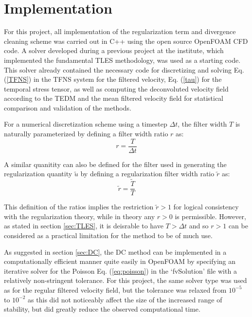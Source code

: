 \chapter{Implementation} \label{chap:Imp}


For this project, all implementation of the regularization term and divergence cleaning scheme was carried out in C++ using the open source OpenFOAM CFD code. A solver developed during a previous project at the institute, which implemented the fundamental TLES methodology, was used as a starting code. This solver already contained the necessary code for discretizing and solving Eq. (\ref{TFNS}) in the TFNS system for the filtered velocity, Eq. (\ref{tau}) for the temporal stress tensor, as well as computing the deconvoluted velocity field according to the TEDM and the mean filtered velocity field for statistical comparison and validation of the methods.

For a numerical discretization scheme using a timestep $\Delta t$, the filter width $T$ is naturally parameterized by defining a filter width ratio $r$ as:
\begin{equation} \label{r}
r=\frac{T}{\Delta t}
\end{equation}

A similar quanitity can also be defined for the filter used in generating the regularization quantity $\tilde{u}$ by defining a regularization filter width ratio $\tilde{r}$ as:
\begin{equation}
\tilde{r}=\frac{\tilde{T}}{T}
\end{equation}

This definition of the ratios implies the restriction $\tilde{r}>1$ for logical consistency with the regularization theory, while in theory any $r>0$ is permissible. However, as stated in section \ref{sec:TLES}, it is deisrable to have $T>\Delta t$ and so $r>1$ can be considered as a practical limitation for the method to be of much use.

As suggested in section \ref{sec:DC}, the DC method can be implemented in a computationally efficient manner quite easily in OpenFOAM by specifying an iterative solver for the Poisson Eq. (\ref{eq:poisson}) in the `fvSolution' file with a relatively non-stringent tolerance. For this project, the same solver type was used as for the regular filtered velocity field, but the tolerance was relaxed from $10^{-5}$ to $10^{-2}$ as this did not noticeably affect the size of the increased range of stability, but did greatly reduce the observed computational time.